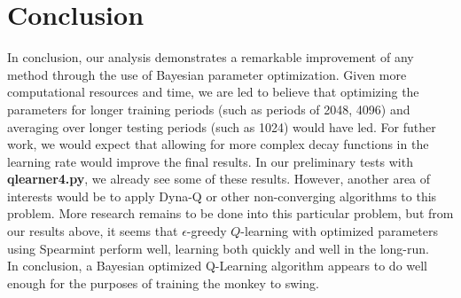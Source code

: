 \documentclass[letterpaper]{article}
\begin{document}
\section{Conclusion}
\label{sec:conclusion}
In conclusion, our analysis demonstrates a remarkable improvement of any method through the use of Bayesian parameter optimization. Given more computational resources and time, we are led to believe that optimizing the parameters for longer training periods (such as periods of 2048, 4096) and averaging over longer testing periods (such as 1024) would have led. For futher work, we would expect that allowing for more complex decay functions in the learning rate would improve the final results. In our preliminary tests with \textbf{qlearner4.py}, we already see some of these results. However, another area of interests would be to apply Dyna-Q or other non-converging algorithms to this problem. More research remains to be done into this particular problem, but from our results above, it seems that $\epsilon$-greedy $Q$-learning with optimized parameters using Spearmint perform well, learning both quickly and well in the long-run.\\

In conclusion, a Bayesian optimized Q-Learning algorithm appears to do well enough for the purposes of training the monkey to swing. 

\printbibliography
\end{document}
